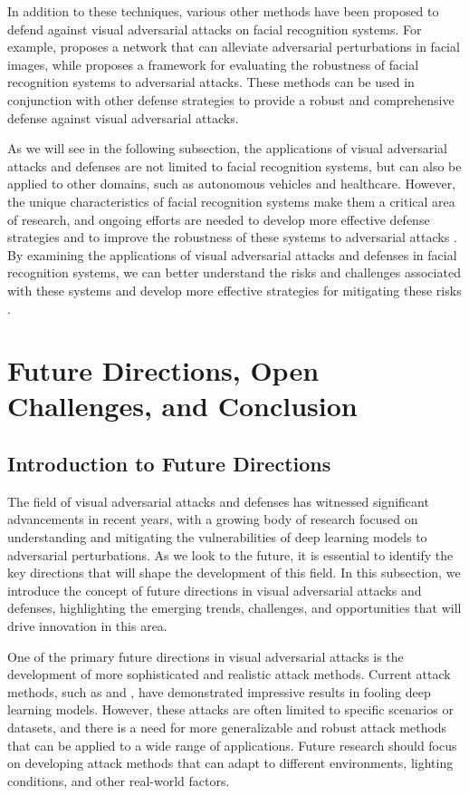 \documentclass[11pt]{article}
\begin{document}
In addition to these techniques, various other methods have been proposed to defend against visual adversarial attacks on facial recognition systems. For example, \cite{ref220} proposes a network that can alleviate adversarial perturbations in facial images, while \cite{ref166} proposes a framework for evaluating the robustness of facial recognition systems to adversarial attacks. These methods can be used in conjunction with other defense strategies to provide a robust and comprehensive defense against visual adversarial attacks.

As we will see in the following subsection, the applications of visual adversarial attacks and defenses are not limited to facial recognition systems, but can also be applied to other domains, such as autonomous vehicles and healthcare. However, the unique characteristics of facial recognition systems make them a critical area of research, and ongoing efforts are needed to develop more effective defense strategies and to improve the robustness of these systems to adversarial attacks \cite{ref11}. By examining the applications of visual adversarial attacks and defenses in facial recognition systems, we can better understand the risks and challenges associated with these systems and develop more effective strategies for mitigating these risks \cite{ref215}.

\section{Future Directions, Open Challenges, and Conclusion}

\subsection{Introduction to Future Directions}

The field of visual adversarial attacks and defenses has witnessed significant advancements in recent years, with a growing body of research focused on understanding and mitigating the vulnerabilities of deep learning models to adversarial perturbations. As we look to the future, it is essential to identify the key directions that will shape the development of this field. In this subsection, we introduce the concept of future directions in visual adversarial attacks and defenses, highlighting the emerging trends, challenges, and opportunities that will drive innovation in this area.

One of the primary future directions in visual adversarial attacks is the development of more sophisticated and realistic attack methods. Current attack methods, such as \cite{ref104} and \cite{ref101}, have demonstrated impressive results in fooling deep learning models. However, these attacks are often limited to specific scenarios or datasets, and there is a need for more generalizable and robust attack methods that can be applied to a wide range of applications. Future research should focus on developing attack methods that can adapt to different environments, lighting conditions, and other real-world factors.
\end{document}
